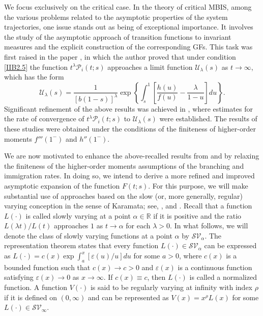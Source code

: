 \documentclass[10pt,reqno]{amsart}
\theoremstyle{definition}
\numberwithin{equation}{section}
\begin{document}
    We focus exclusively on the critical case. In the theory of critical MBIS, among the various problems related to
    the asymptotic properties of the system trajectories, one issue stands out as being of exceptional importance.
    It involves the study of the asymptotic approach of transition functions to invariant measures and the explicit
    construction of the corresponding GFs. This task was first raised in the paper {\cite{Pakes75}}, in which the
    author proved that under condition {\eqref{IIB2.5}} the function $t^{\lambda}{\mathcal{P}}_i(t;s)$ approaches
    a limit function ${{\mathcal{U}}_{\lambda}}(s)$ as $t\to\infty$, which has the form
\begin{equation}                              \label{IIB2.6}
    {{\mathcal{U}}_{\lambda}}(s)=\frac{1}{{[b(1-s)]}^{\lambda}}
    \exp\left\{\int_{s}^{1}{\left[\frac{h(u)}{f(u)}-\frac{\lambda}{1-u}\right]du}\right\}.
\end{equation}
    Significant refinement of the above results was achieved in {\cite{ImJSFU14}}, where estimates for the rate
    of convergence of ${t^{\lambda}}{{\mathcal{P}}_{i}}(t;s)$ to ${{\mathcal{U}}_{\lambda}}(s)$ were established.
    The results of these studies were obtained under the conditions of the finiteness of higher-order
    moments $f'''(1^{-})$ and $h''(1^{-})$.

    We are now motivated to enhance the above-recalled results from {\cite{ImJSFU14}} and {\cite{Pakes75}} by relaxing
    the finiteness of the higher-order moments assumptions of the branching and immigration rates. In doing so, we
    intend to derive a more refined and improved asymptotic expansion of the function $F(t;s)$. For this purpose,
    we will make substantial use of approaches based on the slow (or, more generally, regular) varying conception
    in the sense of Karamata; see, {\cite{AsHer}}, {\cite{Bingham}} and {\cite{SenetaRV}}. Recall that a function
    $L(\cdot)$ is called slowly varying at a point $\alpha\in\mathbb{R}$ if it is positive and the ratio
    ${L(\lambda{t})}/{L(t)}$ approaches $1$ as $t\to\alpha$ for each $\lambda>0$. In what follows, we will denote
    the class of slowly varying functions at a point $\alpha$ by ${\mathcal{SV}}_{\alpha}$. The representation
    theorem states that every function $L(\cdot)\in{\mathcal{SV}}_{\alpha}$ can be expressed
    as $L(\cdot)=c(x)\exp\int_{a}^{x}{\left[{\varepsilon(u)}/{u}\right]du}$ for some $a>0$, where $c(x)$ is a bounded
    function such that $c(x)\to{c}>0$ and $\varepsilon(x)$ is a continuous function satisfying $\varepsilon(x)\to{0}$
    as $x\to\infty$. If $c(x)\equiv{c}$, then $L(\cdot)$ is called a normalized function. A function $V(\cdot)$ is
    said to be regularly varying at infinity with index $\rho$ if it is defined on $(0,\infty)$ and can be
    represented as $V(x)={x^{\rho}}L(x)$ for some $L(\cdot)\in{\mathcal{SV}}_{\infty}$.
\end{document}
